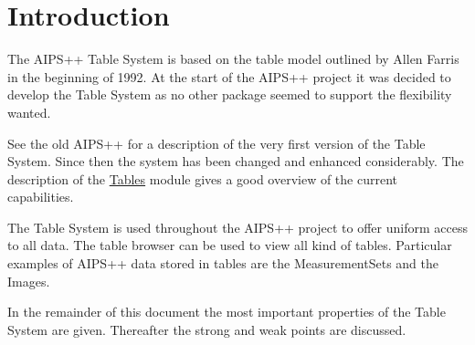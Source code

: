 \section{Introduction}
The AIPS++ Table System is based on the table model outlined
by Allen Farris in the beginning of 1992. At the start of the AIPS++
project it was decided to develop the Table System as no other package
seemed to support the flexibility wanted.

See the old AIPS++
for a description of the very first version of the Table System.
Since then the system has been changed and enhanced considerably.
The description of the
\href{../html/group__Tables__module.html}{Tables}
module gives a good overview of the current capabilities.

The Table System is used throughout the AIPS++ project to offer
uniform access to all data. The table browser can be used to view
all kind of tables.
Particular examples of AIPS++ data stored
in tables are the MeasurementSets and the Images.

In the remainder of this document the most important properties of the
Table System are given. Thereafter the strong and weak points are
discussed. 

